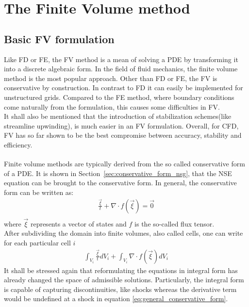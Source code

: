 \documentclass[../main.tex]{subfiles}
\begin{document}
\setlength{\delimitershortfall}{0pt}


\chapter{The Finite Volume method}\label{sec:finite_volume_method}
\minitoc

\section{Basic \acl{FV} formulation}\label{sec:basic_fv}
Like \ac{FD} or \acf{FE}, the \acf{FV} method is a mean of solving a \ac{PDE} by transforming it into a discrete algebraic form. In the field of fluid mechanics, the finite volume method is the most popular approach. Other than \ac{FD} or \ac{FE}, the \ac{FV} is conservative by construction. In contrast to \ac{FD} it can easily be implemented for unstructured grids. Compared to the \ac{FE} method, where boundary conditions come naturally from the formulation, this causes some difficulties in \ac{FV}.\\
It shall also be mentioned that the introduction of stabilization schemes(like streamline upwinding), is much easier in an \ac{FV} formulation.
Overall, for \ac{CFD}, \ac{FV} has so far shown to be the best compromise between accuracy, stability and efficiency.
 \\
 \\
Finite volume methods are typically derived from the so called conservative form of a \ac{PDE}. It is shown in Section~\ref{sec:conservative_form_nsg}, that the \ac{NSE} equation can be  brought to the conservative form. In general, the conservative form can be written as:
\begin{align}\label{eq:general_conservative_form}
\tfrac{\vec{\xi}}{t}+\nabla\cdot f(\vec{\xi}) = \vec{0} \\
\end{align}
where $\vec{\xi}$ represents a vector of states and $f$ is the so-called flux tensor.\\
After subdividing the domain into finite volumes, also called cells, one can write for each particular cell $i$
\begin{align}
\int_{V_i} \tfrac{\vec{\xi}}{t} dV_i + \int_{V_i} \nabla\cdot f(\vec{\xi}) dV_i
\end{align}
It shall be stressed again that reformulating the equations in integral form has already changed the space of admissible solutions. Particularly, the integral form is capable of capturing discontinuities, like shocks whereas the derivative term would be undefined  at a shock in equation \eqref{eq:general_conservative_form}.
\end{document}
